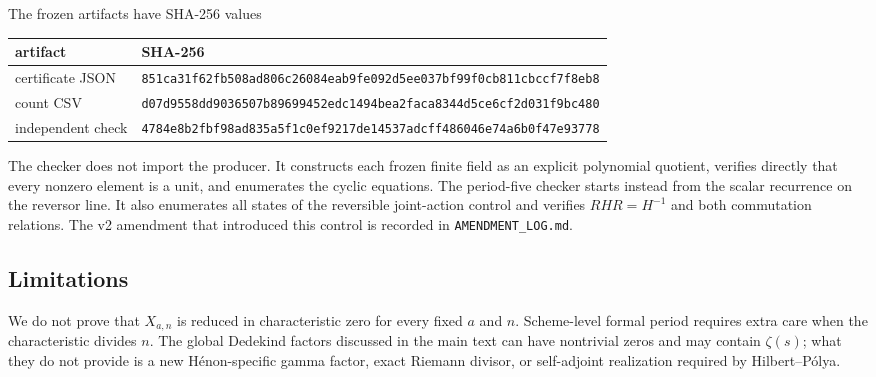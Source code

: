 The frozen artifacts have SHA-256 values
\begin{center}
{\scriptsize
\begin{tabular}{ll}
\toprule
artifact & SHA-256\\
\midrule
certificate JSON & \texttt{851ca31f62fb508ad806c26084eab9fe092d5ee037bf99f0cb811cbccf7f8eb8}\\
count CSV & \texttt{d07d9558dd9036507b89699452edc1494bea2faca8344d5ce6cf2d031f9bc480}\\
independent check & \texttt{4784e8b2fbf98ad835a5f1c0ef9217de14537adcff486046e74a6b0f47e93778}\\
\bottomrule
\end{tabular}
}
\end{center}

The checker does not import the producer.  It constructs each frozen finite
field as an explicit polynomial quotient, verifies directly that every
nonzero element is a unit, and enumerates the cyclic equations.  The
period-five checker starts instead from the scalar recurrence on the reversor
line.  It also enumerates all states of the reversible joint-action control
and verifies $RHR=H^{-1}$ and both commutation relations.  The v2 amendment
that introduced this control is recorded in \texttt{AMENDMENT\_LOG.md}.

\subsection{Limitations}

We do not prove that $X_{a,n}$ is reduced in characteristic zero for every
fixed $a$ and $n$.  Scheme-level formal period requires extra care when the
characteristic divides $n$.  The global Dedekind factors discussed in the main
text can have nontrivial zeros and may contain $\zeta(s)$; what they do not
provide is a new H\'enon-specific gamma factor, exact Riemann divisor, or
self-adjoint realization required by Hilbert--P\'olya.
